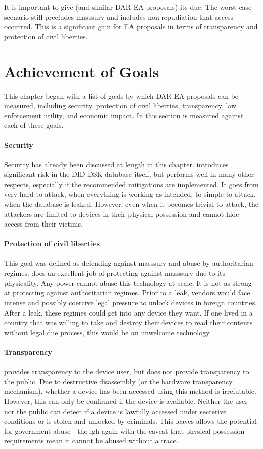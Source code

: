 It is important to give \ldawmsr (and similar \ac{DAR} \ac{EA} proposals) its due. The worst case scenario still
precludes \ac{masssurv} and includes non-repudiation that access occurred. This is a significant gain for \ac{EA}
proposals in terms of transparency and protection of civil liberties.


\section{Achievement of Goals}

This chapter began with a list of goals by which \ac{DAR} \ac{EA} proposals can be measured, including security,
protection of civil liberties, transparency, law enforcement utility, and economic impact. In this section \ldawmsr is
measured against each of these goals.

\paragraph*{Security} Security has already been discussed at length in this chapter. \ldawmsr introduces significant
risk in the DID-DSK database itself, but performs well in many other respects, especially if the recommended mitigations
are implemented. It goes from very hard to attack, when everything is working as intended, to simple to attack, when the
database is leaked. However, even when it becomes trivial to attack, the attackers are limited to devices in their
physical possession and cannot hide access from their victims.

\paragraph*{Protection of civil liberties} This goal was defined as defending against \ac{masssurv} and abuse by
authoritarian regimes. \ldawmsr does an excellent job of protecting against \ac{masssurv} due to its physicality. Any
power cannot abuse this technology at scale. It is not as strong at protecting against authoritarian regimes. Prior to a
leak, vendors would face intense and possibly coercive legal pressure to unlock devices in foreign countries. After a
leak, these regimes could get into any device they want. If one lived in a country that was willing to take and destroy
their devices to read their contents without legal due process, this would be an unwelcome technology.

\paragraph*{Transparency} \ldawmsr provides transparency to the device user, but does not provide transparency to the
public. Due to destructive disassembly (or the hardware transparency mechanism), whether a device has been accessed
using this method is irrefutable. However, this can only be confirmed if the device is available. Neither the user nor
the public can detect if a device is lawfully accessed under secretive conditions or is stolen and unlocked by
criminals. This leaves allows the potential for government abuse---though again with the caveat that physical possession
requirements mean it cannot be abused without a trace.

